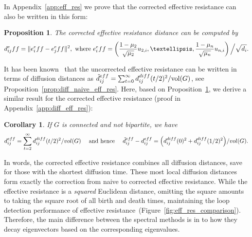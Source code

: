 \documentclass{article}
\theoremstyle{plain}
\newtheorem{proposition}[theorem]{Proposition}
\newtheorem{corollary}[theorem]{Corollary}
\theoremstyle{definition}
\theoremstyle{remark}
\begin{document}
In Appendix~\ref{app:eff_res} we prove that the corrected effective resistance \citep{luxburg2010getting} can also be written in this form:
\begin{proposition} \label{prop:corr_eff_res_main}
The corrected effective resistance distance can be computed by 
\begin{align}
    d_{ij}^\textnormal{eff}= \|e_i^\textnormal{eff} -e_j^\textnormal{eff}\|^2, \text{ where } 
    e_i^\textnormal{eff} = \left(\frac{1-\mu_2}{\sqrt{\mu_2} }u_{2,i}, \ldots, \frac{1-\mu_n}{\sqrt{\mu_n}}u_{n,i}\right) \Big/ \sqrt{d_i}. \label{eq:eff_res_corr}
\end{align}
\end{proposition}
It has been known~\cite{memoli} that the  uncorrected effective resistance can be written in terms of diffusion distances as \mbox{$\tilde{d}^{\textnormal{eff}}_{ij} = \sum_{t=0}^\infty d^{\textnormal{diff}}_{ij}(t/2)^2 / \text{vol}(G)$,} see Proposition~\ref{prop:diff_naive_eff_res}.
Here, based on Proposition~\ref{prop:corr_eff_res_main}, we derive a similar result for the corrected effective resistance (proof in Appendix~\ref{app:diff_eff_res}): 
\begin{corollary}\label{cor:diff_corr_eff_res_short}
    If $G$ is connected and not bipartite, we have
    \begin{align}
        d^{\textnormal{eff}}_{ij} = 
        \sum_{t=2}^\infty d^{\textnormal{diff}}_{ij}(t/2)^2 / \textnormal{vol}(G) \label{eq:diff_corr_eff_res_main} 
        \quad \text{ and hence } \quad       \tilde{d}^{\textnormal{eff}}_{ij} - d^{\textnormal{eff}}_{ij} = \Big(d^{\textnormal{diff}}_{ij}(0)^2 + d^{\textnormal{diff}}_{ij}(1/2)^2\Big)/\textnormal{vol}(G).
    \end{align}
\end{corollary}
In words, the corrected effective resistance combines all diffusion distances, save for those with the shortest diffusion time. These most local diffusion distances form exactly the correction from naive to corrected effective resistance. While the effective resistance is a \textit{squared} Euclidean distance, omitting the square amounts to taking the square root of all birth and death times, maintaining the loop detection performance of effective resistance~(Figure~\ref{fig:eff_res_comparison}). Therefore, the main difference between the spectral methods is in to how they decay eigenvectors based on the corresponding eigenvalues.
\end{document}
